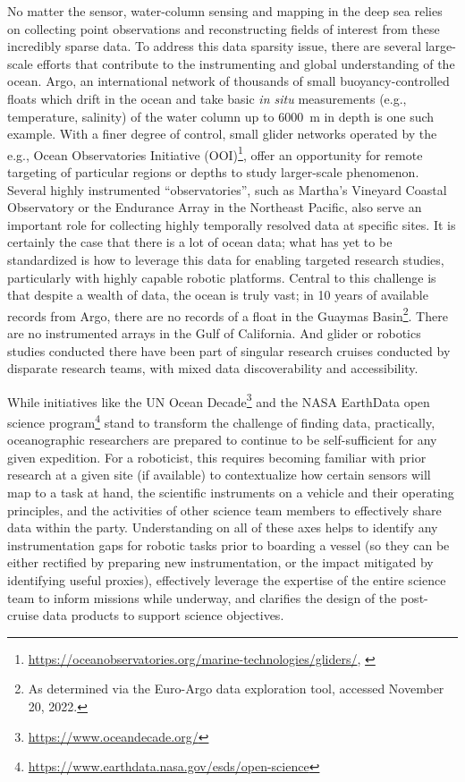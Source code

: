No matter the sensor, water-column sensing and mapping in the deep sea relies on collecting point observations and reconstructing fields of interest from these incredibly sparse data.
To address this data sparsity issue, there are several large-scale efforts that contribute to the instrumenting and global understanding of the ocean. Argo, an international network of thousands of small buoyancy-controlled floats which drift in the ocean and take basic \emph{in situ} measurements (e.g., temperature, salinity) of the water column up to \SI{6000}{\meter} in depth is one such example\autocite{roemmich2009argo,jayne2017argo}. With a finer degree of control, small glider networks operated by the e.g., Ocean Observatories Initiative (OOI)\footnote{\url{https://oceanobservatories.org/marine-technologies/gliders/}, \autocite{trowbridge2019ocean}}, offer an opportunity for remote targeting of particular regions or depths to study larger-scale phenomenon. Several highly instrumented ``observatories'', such as Martha's Vineyard Coastal Observatory\autocite{austin2000martha} or the Endurance Array in the Northeast Pacific\autocite{barth2018warm}, also serve an important role for collecting highly temporally resolved data at specific sites. It is certainly the case that there is a lot of ocean data; what has yet to be standardized is how to leverage this data for enabling targeted research studies, particularly with highly capable robotic platforms. Central to this challenge is that despite a wealth of data, the ocean is truly vast; in 10 years of available records from Argo, there are no records of a float in the Guaymas Basin\footnote{As determined via the Euro-Argo data exploration tool, accessed November 20, 2022.}. There are no instrumented arrays in the Gulf of California. And glider or robotics studies conducted there have been part of singular research cruises conducted by disparate research teams, with mixed data discoverability and accessibility. 

While initiatives like the UN Ocean Decade\footnote{\url{https://www.oceandecade.org/}} and the NASA EarthData open science program\footnote{\url{https://www.earthdata.nasa.gov/esds/open-science}} stand to transform the challenge of finding data, practically, oceanographic researchers are prepared to continue to be self-sufficient for any given expedition.
For a roboticist, this requires becoming familiar with prior research at a given site (if available) to contextualize how certain sensors will map to a task at hand, the scientific instruments on a vehicle and their operating principles, and the activities of other science team members to effectively share data within the party. Understanding on all of these axes helps to identify any instrumentation gaps for robotic tasks prior to boarding a vessel (so they can be either rectified by preparing new instrumentation, or the impact mitigated by identifying useful proxies), effectively leverage the expertise of the entire science team to inform missions while underway, and clarifies the design of the post-cruise data products to support science objectives.

